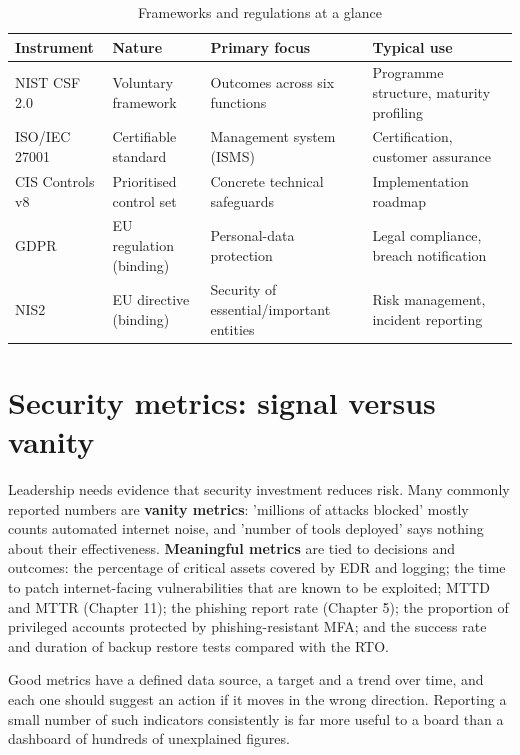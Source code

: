 \begin{table}[htbp]
  \centering\small
  \caption{Frameworks and regulations at a glance}
  \begin{tabularx}{\linewidth}{>{\raggedright\arraybackslash}X >{\raggedright\arraybackslash}X >{\raggedright\arraybackslash}X >{\raggedright\arraybackslash}X}
    \toprule
    \textbf{Instrument} & \textbf{Nature} & \textbf{Primary focus} & \textbf{Typical use} \\
    \midrule
    NIST CSF 2.0 & Voluntary framework & Outcomes across six functions & Programme structure, maturity profiling \\
    ISO/IEC 27001 & Certifiable standard & Management system (ISMS) & Certification, customer assurance \\
    CIS Controls v8 & Prioritised control set & Concrete technical safeguards & Implementation roadmap \\
    GDPR & EU regulation (binding) & Personal-data protection & Legal compliance, breach notification \\
    NIS2 & EU directive (binding) & Security of essential/important entities & Risk management, incident reporting \\
    \bottomrule
  \end{tabularx}
\end{table}
\section{Security metrics: signal versus vanity}\label{sec:13.5}
Leadership needs evidence that security investment reduces risk. Many commonly reported numbers are \textbf{vanity metrics}: 'millions of attacks blocked' mostly counts automated internet noise, and 'number of tools deployed' says nothing about their effectiveness. \textbf{Meaningful metrics} are tied to decisions and outcomes: the percentage of critical assets covered by EDR and logging; the time to patch internet-facing vulnerabilities that are known to be exploited; MTTD and MTTR (Chapter 11); the phishing report rate (Chapter 5); the proportion of privileged accounts protected by phishing-resistant MFA; and the success rate and duration of backup restore tests compared with the RTO.

Good metrics have a defined data source, a target and a trend over time, and each one should suggest an action if it moves in the wrong direction. Reporting a small number of such indicators consistently is far more useful to a board than a dashboard of hundreds of unexplained figures.

